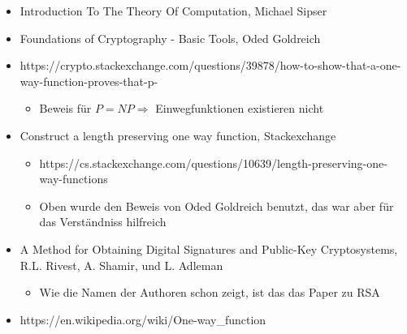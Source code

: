 \documentclass[12pt,a4paper]{article}
\theoremstyle{definition}
\begin{document}
    \begin{itemize}
        \item Introduction To The Theory Of Computation, Michael Sipser
        \item Foundations of Cryptography - Basic Tools, Oded Goldreich
        \item https://crypto.stackexchange.com/questions/39878/how-to-show-that-a-one-way-function-proves-that-p-%
        \begin{itemize}
            \item Beweis für $P = NP \Rightarrow$ Einwegfunktionen existieren nicht
        \end{itemize}
        \item Construct a length preserving one way function, Stackexchange
        \begin{itemize}
            \item https://cs.stackexchange.com/questions/10639/length-preserving-one-way-functions
            \item Oben wurde den Beweis von Oded Goldreich benutzt, das war aber für das Verständniss hilfreich
        \end{itemize}
        \item A Method for Obtaining Digital Signatures and Public-Key Cryptosystems,
            R.L. Rivest, A. Shamir, und L. Adleman
        \begin{itemize}
            \item Wie die Namen der Authoren schon zeigt, ist das das Paper zu RSA
        \end{itemize}
        \item https://en.wikipedia.org/wiki/One-way\_function
    \end{itemize}
\end{document}
